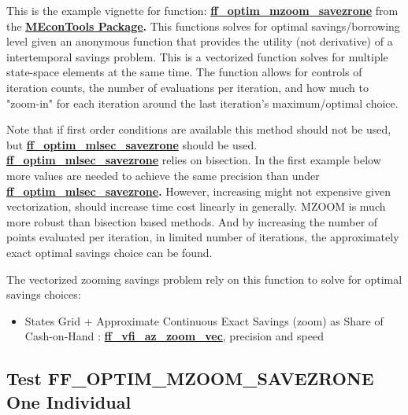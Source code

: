 \documentclass[
]{book}
\providecommand{\tightlist}{%
  \setlength{\itemsep}{0pt}\setlength{\parskip}{0pt}}
\begin{document}
This is the example vignette for function:
\href{https://github.com/FanWangEcon//MEconTools/blob/master/MEconTools/optim/ff_optim_mzoom_savezrone.m}{\textbf{ff\_optim\_mzoom\_savezrone}}
from the \href{https://fanwangecon.github.io/MEconTools/}{\textbf{MEconTools
Package}}\textbf{.} This
functions solves for optimal savings/borrowing level given an anonymous
function that provides the utility (not derivative) of a intertemporal
savings problem. This is a vectorized function solves for multiple
state-space elements at the same time. The function allows for controls
of iteration counts, the number of evaluations per iteration, and how
much to "zoom-in" for each iteration around the last iteration's
maximum/optimal choice.

Note that if first order conditions are available this method should not
be used, but
\href{https://github.com/FanWangEcon//MEconTools/blob/master/MEconTools/optim/ff_optim_mlsec_savezrone.m}{\textbf{ff\_optim\_mlsec\_savezrone}}
should be used.
\href{https://github.com/FanWangEcon//MEconTools/blob/master/MEconTools/optim/ff_optim_mlsec_savezrone.m}{\textbf{ff\_optim\_mlsec\_savezrone}}
relies on bisection. In the first example below more values are needed
to achieve the same precision than under
\href{https://github.com/FanWangEcon//MEconTools/blob/master/MEconTools/optim/ff_optim_mlsec_savezrone.m}{\textbf{ff\_optim\_mlsec\_savezrone}}\textbf{.}
However, increasing might not expensive given vectorization, should
increase time cost linearly in generally. MZOOM is much more robust than
bisection based methods. And by increasing the number of points
evaluated per iteration, in limited number of iterations, the
approximately exact optimal savings choice can be found.

The vectorized zooming savings problem rely on this function to solve
for optimal savings choices:

\begin{itemize}
\tightlist
\item
  States Grid + Approximate Continuous Exact Savings (zoom) as Share
  of Cash-on-Hand :
  \href{https://github.com/FanWangEcon/MEconTools/blob/master/MEconTools/vfi/ff_vfi_az_zoom_vec.m}{\textbf{ff\_vfi\_az\_zoom\_vec}},
  precision and speed
\end{itemize}

\hypertarget{test-ff_optim_mzoom_savezrone-one-individual}{%
\subsection{Test FF\_OPTIM\_MZOOM\_SAVEZRONE One Individual}\label{test-ff_optim_mzoom_savezrone-one-individual}}
\end{document}
